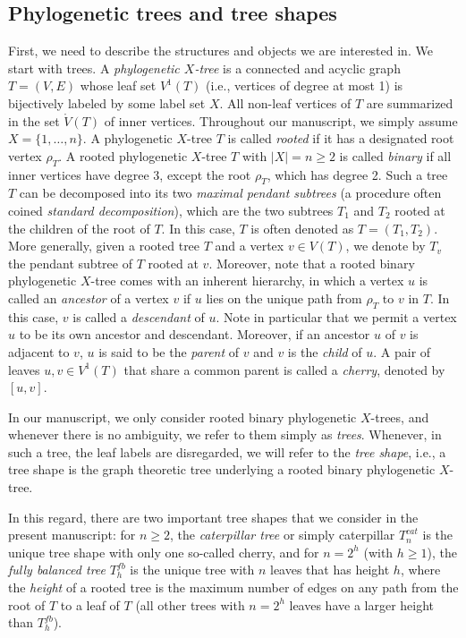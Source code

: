 \documentclass{amsart}
\theoremstyle{definition}
\begin{document}
\subsection*{Phylogenetic trees and tree shapes} First, we need to describe the structures and objects we are interested in. We start with trees. A \emph{phylogenetic $X$-tree} is a connected and acyclic graph $T=(V,E)$ whose leaf set $V^1(T)$ (i.e., vertices of degree at most 1) is bijectively labeled by some label set $X$. All non-leaf vertices of $T$ are summarized in the set $\mathring{V}(T)$ of inner vertices. Throughout our manuscript, we simply assume $X=\{1,\ldots,n\}$. A phylogenetic $X$-tree $T$ is called \emph{rooted} if it has a designated root vertex $\rho_T$. A rooted phylogenetic $X$-tree $T$ with $|X|=n\geq 2$ is called \emph{binary} if all inner vertices have degree 3, except the root $\rho_T$, which has degree 2. Such a tree $T$ can be decomposed into its two \emph{maximal pendant subtrees} (a procedure often coined \emph{standard decomposition}), which are the two subtrees $T_1$ and $T_2$ rooted at the children of the root of $T$. In this case, $T$ is often denoted as $T=(T_1,T_2)$. More generally, given a rooted tree $T$ and a vertex $v \in V(T)$, we denote by $T_v$ the pendant subtree of $T$ rooted at $v$. Moreover, note that a rooted binary phylogenetic $X$-tree comes with an inherent hierarchy, in which a vertex $u$ is called an \emph{ancestor} of a vertex $v$ if $u$ lies on the unique path from $\rho_T$ to $v$ in $T$. In this case, $v$ is called a \emph{descendant} of $u$. Note in particular that we permit a vertex $u$ to be its own ancestor and descendant. 
Moreover, if an ancestor $u$ of $v$ is adjacent to $v$, $u$ is said to be the \emph{parent} of $v$ and $v$ is the \emph{child} of $u$. A pair of leaves $u,v \in V^1(T)$ that share a common parent is called a \emph{cherry}, denoted by $[u,v]$.


In our manuscript, we only consider rooted binary phylogenetic $X$-trees, and whenever there is no ambiguity, we refer to them simply as \emph{trees}. Whenever, in such a tree, the leaf labels are disregarded, we will refer to the \emph{tree shape}, i.e., a tree shape is the graph theoretic tree underlying a rooted binary phylogenetic $X$-tree. 

In this regard, there are two important tree shapes that we consider in the present manuscript: for $n\geq 2$, the \emph{caterpillar tree} or simply caterpillar $T_n^{cat}$ is the unique tree shape with only one so-called cherry, and for $n=2^h$ (with $h\geq 1$), the \emph{fully balanced tree} $T_h^{fb}$ is the unique tree with $n$ leaves that has height $h$, where the \emph{height} of a rooted tree is the maximum number of edges on any path from the root of $T$ to a leaf of $T$ (all other trees with $n=2^h$ leaves have a larger height than $T_h^{fb}$).
\end{document}
